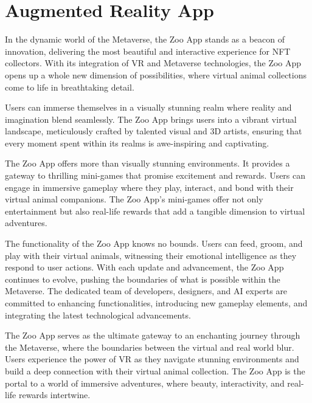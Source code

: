 \section{Augmented Reality App}

In the dynamic world of the Metaverse, the Zoo App stands as a beacon of innovation, delivering the most beautiful and interactive experience for NFT collectors. With its integration of VR and Metaverse technologies, the Zoo App opens up a whole new dimension of possibilities, where virtual animal collections come to life in breathtaking detail.

Users can immerse themselves in a visually stunning realm where reality and imagination blend seamlessly. The Zoo App brings users into a vibrant virtual landscape, meticulously crafted by talented visual and 3D artists, ensuring that every moment spent within its realms is awe-inspiring and captivating.

The Zoo App offers more than visually stunning environments. It provides a gateway to thrilling mini-games that promise excitement and rewards. Users can engage in immersive gameplay where they play, interact, and bond with their virtual animal companions. The Zoo App's mini-games offer not only entertainment but also real-life rewards that add a tangible dimension to virtual adventures.

The functionality of the Zoo App knows no bounds. Users can feed, groom, and play with their virtual animals, witnessing their emotional intelligence as they respond to user actions. With each update and advancement, the Zoo App continues to evolve, pushing the boundaries of what is possible within the Metaverse. The dedicated team of developers, designers, and AI experts are committed to enhancing functionalities, introducing new gameplay elements, and integrating the latest technological advancements.

The Zoo App serves as the ultimate gateway to an enchanting journey through the Metaverse, where the boundaries between the virtual and real world blur. Users experience the power of VR as they navigate stunning environments and build a deep connection with their virtual animal collection. The Zoo App is the portal to a world of immersive adventures, where beauty, interactivity, and real-life rewards intertwine.
